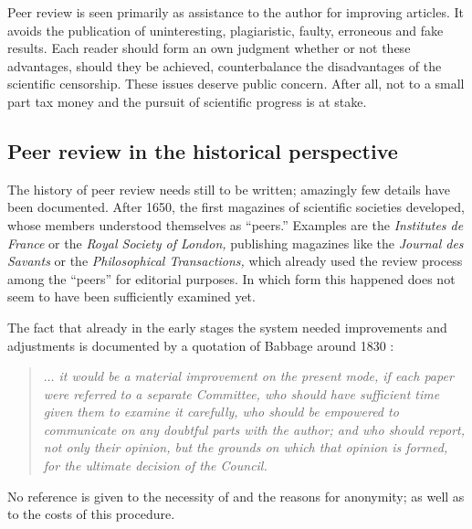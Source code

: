 Peer review is seen primarily as assistance to the author for improving
articles.  It avoids the publication of uninteresting, plagiaristic,
faulty, erroneous and fake results.
Each reader should form an own judgment whether or not these advantages,
should they be achieved, counterbalance the disadvantages of the
scientific censorship.  These
issues deserve public concern.  After all, not to a small part tax money
and the pursuit of scientific progress is at stake.

\subsection{Peer review in the historical perspective}

The history of peer review  needs still to be written;
amazingly few details have been documented.  After 1650, the first
magazines of scientific societies developed, whose members understood
themselves as ``peers.''  Examples are the {\it Institutes de France} or
the {\it Royal Society of London,} publishing magazines like the {\it
Journal des Savants} or the {\it Philosophical Transactions,} which
already used the review process among the ``peers'' for editorial
purposes.  In which form this happened does not seem to have been sufficiently
examined yet.

The fact that already in the early stages the system needed improvements
and adjustments is documented by a quotation of Babbage around 1830
\cite{babbage-1830}:  \begin{quote} {\em $\ldots $ it would be a
material improvement on the present mode, if each paper were referred to
a separate Committee, who should have sufficient time given them to
examine it carefully, who should be empowered to communicate on any
doubtful parts with the author; and who should report, not only their
opinion, but the grounds on which that opinion is formed, for the
ultimate decision of the Council.} \end{quote} No reference is given to
the necessity of and the reasons for anonymity; as well as to the costs of
this procedure.

